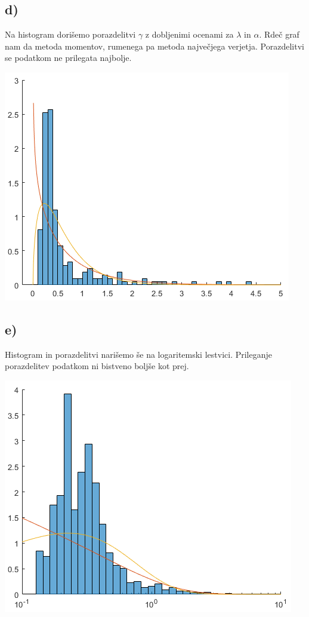 \documentclass[A4paper, 11pt]{article}
\begin{document}
\subsection*{d)}
Na histogram dorišemo porazdelitvi $\gamma$ z dobljenimi ocenami za $\lambda$ in $\alpha$. Rdeč graf nam da metoda momentov, rumenega pa metoda največjega verjetja. Porazdelitvi se podatkom ne prilegata najbolje.

\includegraphics[scale=0.8]{Kiti_2}


\subsection*{e)}
Histogram in porazdelitvi narišemo še na logaritemski lestvici. Prileganje porazdelitev podatkom ni bistveno boljše kot prej.

\includegraphics[scale=0.8]{Kiti_3}
\end{document}
